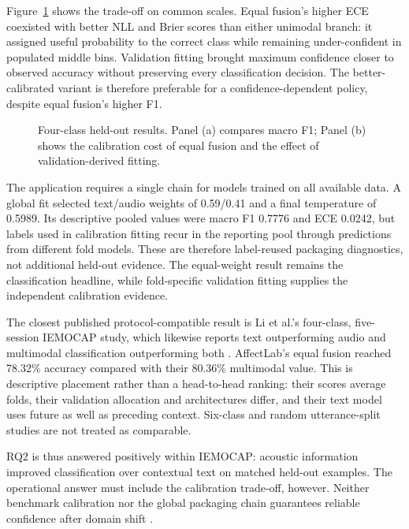Figure~\ref{fig:model-results} shows the trade-off on common scales. Equal fusion's higher ECE coexisted with better NLL and Brier scores than either unimodal branch: it assigned useful probability to the correct class while remaining under-confident in populated middle bins. Validation fitting brought maximum confidence closer to observed accuracy without preserving every classification decision. The better-calibrated variant is therefore preferable for a confidence-dependent policy, despite equal fusion's higher F1.

\begin{figure}[htbp]
\centering

\caption{Four-class held-out results. Panel (a) compares macro F1; Panel (b) shows the calibration cost of equal fusion and the effect of validation-derived fitting.}
\label{fig:model-results}
\end{figure}

The application requires a single chain for models trained on all available data. A global fit selected text/audio weights of 0.59/0.41 and a final temperature of 0.5989. Its descriptive pooled values were macro F1 0.7776 and ECE 0.0242, but labels used in calibration fitting recur in the reporting pool through predictions from different fold models. These are therefore label-reused packaging diagnostics, not additional held-out evidence. The equal-weight result remains the classification headline, while fold-specific validation fitting supplies the independent calibration evidence.

The closest published protocol-compatible result is Li et al.'s four-class, five-session IEMOCAP study, which likewise reports text outperforming audio and multimodal classification outperforming both \cite{li2022contextaware}. AffectLab's equal fusion reached 78.32\% accuracy compared with their 80.36\% multimodal value. This is descriptive placement rather than a head-to-head ranking: their scores average folds, their validation allocation and architectures differ, and their text model uses future as well as preceding context. Six-class and random utterance-split studies are not treated as comparable.

RQ2 is thus answered positively within IEMOCAP: acoustic information improved classification over contextual text on matched held-out examples. The operational answer must include the calibration trade-off, however. Neither benchmark calibration nor the global packaging chain guarantees reliable confidence after domain shift \cite{ovadia2019shift}.

